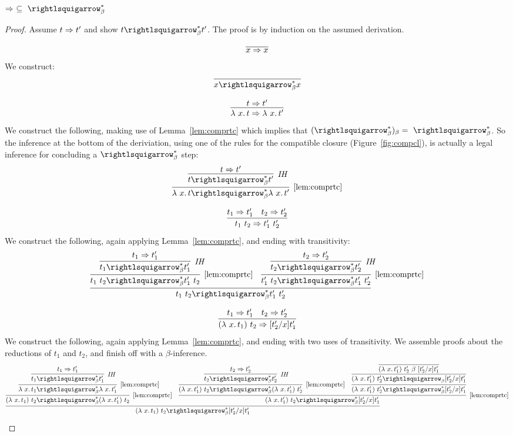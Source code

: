 \begin{lemma}
  \label{lem:predmbeta}
  $\Pred\ \subseteq\ \betaa_\beta^*$
\end{lemma}
\begin{proof}
  Assume $t \Rightarrow t'$ and show $t \betaa_\beta^* t'$.  The proof is by induction on the assumed
  derivation.

  \case{ }
  \[
  \predvar
  \]
  \noindent We construct:
  \[
  \infer{x \betaa_\beta^* x}{\ }
  \]

  \case{ }
  \[
  \predlam
  \]
  \noindent We construct the following, making use of
  Lemma~\ref{lem:comprtc} which implies that $(\betaa_\beta^*)_\beta
  = \ \betaa_\beta^*$. So the inference at the bottom of the
  deriviation, using one of the rules for the compatible closure
  (Figure~\ref{fig:compcl}), is actually a legal inference for
  concluding a $\betaa_\beta^*$ step:
  \[
  \infer[\ref{lem:comprtc}]{\lam{x}{t} \betaa_\beta^* \lam{x}{t'}}
    {\infer[\textit{IH}]{t \betaa_\beta^* t'}{t \Pred t'}}
    \]

    \case{ }
    \[
    \predapp
    \]
    \noindent We construct the following, again applying Lemma~\ref{lem:comprtc}, and ending with transitivity:
    \[
    \infer{t_1\ t_2 \betaa_\beta^* t_1'\ t_2'}
          {\infer[\ref{lem:comprtc}]{t_1\ t_2 \betaa_\beta^* t_1'\ t_2}{\infer[\textit{IH}]{t_1 \betaa_\beta^* t_1'}{t_1 \Pred t_1'}} &
           \infer[\ref{lem:comprtc}]{t_1'\ t_2 \betaa_\beta^* t_1'\ t_2'}{\infer[\textit{IH}]{t_2 \betaa_\beta^* t_2'}{t_2 \Pred t_2'}}}
          \]

    \case{ }
    \[
    \predbeta
    \]
    \noindent We construct the following, again applying Lemma~\ref{lem:comprtc}, and ending with two uses of transitivity.  We assemble proofs about the reductions of $t_1$ and $t_2$, and finish off with a $\beta$-inference.
    \[
    \infer{(\lam{x}{t_1})\ t_2 \betaa_\beta^* [t_2'/x]t_1'}
          {\infer[\ref{lem:comprtc}]{(\lam{x}{t_1})\ t_2 \betaa_\beta^* (\lam{x}{t_1'})\ t_2}
                {\infer[\ref{lem:comprtc}]{\lam{x}{t_1} \betaa_\beta^* \lam{x}{t_1'}}{\infer[\textit{IH}]{t_1 \betaa_\beta^* t_1'}{t_1 \Pred t_1'}}} &
                \infer[\ref{lem:comprtc}]{(\lam{x}{t_1'})\ t_2 \betaa_\beta^* [t_2'/x]t_1'}
                      {\infer[\ref{lem:comprtc}]{(\lam{x}{t_1'})\ t_2 \betaa_\beta^* (\lam{x}{t_1'})\ t_2'}
                        {\infer[\textit{IH}]{t_2 \betaa_\beta^* t_2'}{t_2 \Pred t_2'}}
                     & \infer{(\lam{x}{t_1'})\ t_2' \betaa_\beta^* [t_2'/x]t_1'}{\infer{(\lam{x}{t_1'})\ t_2' \betaa_\beta [t_2'/x]t_1'}{\infer{(\lam{x}{t_1'})\ t_2' \ \beta\  [t_2'/x]t_1'}{\ }}}}}
          \]

          
\end{proof}



